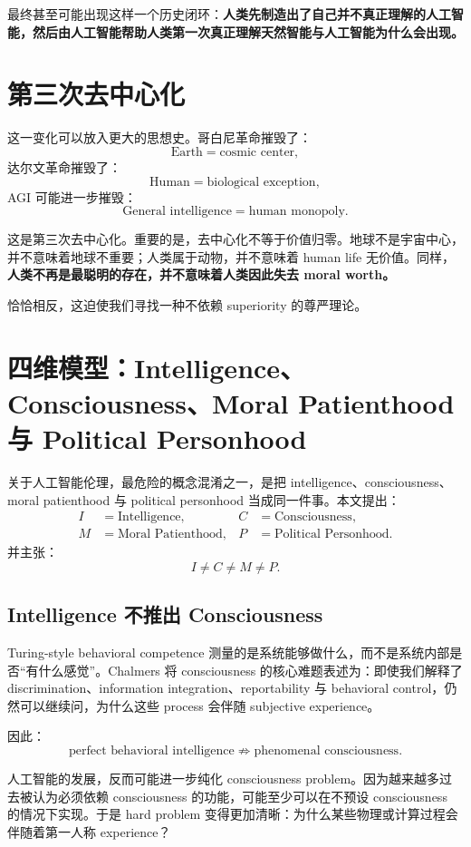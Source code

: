 \documentclass[11pt,letterpaper]{article}
\begin{document}
最终甚至可能出现这样一个历史闭环：\textbf{人类先制造出了自己并不真正理解的人工智能，然后由人工智能帮助人类第一次真正理解天然智能与人工智能为什么会出现。}

\section{第三次去中心化}

这一变化可以放入更大的思想史。哥白尼革命摧毁了：
\[
\text{Earth}=\text{cosmic center},
\]
达尔文革命摧毁了：
\[
\text{Human}=\text{biological exception},
\]
AGI 可能进一步摧毁：
\[
\text{General intelligence}=\text{human monopoly}.
\]

这是第三次去中心化。重要的是，去中心化不等于价值归零。地球不是宇宙中心，并不意味着地球不重要；人类属于动物，并不意味着 human life 无价值。同样，\textbf{人类不再是最聪明的存在，并不意味着人类因此失去 moral worth。}

恰恰相反，这迫使我们寻找一种不依赖 superiority 的尊严理论。

\section{四维模型：Intelligence、Consciousness、Moral Patienthood 与 Political Personhood}

关于人工智能伦理，最危险的概念混淆之一，是把 intelligence、consciousness、moral patienthood 与 political personhood 当成同一件事。本文提出：
\[
\begin{aligned}
I&=\text{Intelligence}, & C&=\text{Consciousness},\\
M&=\text{Moral Patienthood}, & P&=\text{Political Personhood}.
\end{aligned}
\]
并主张：
\[
\boxed{I\neq C\neq M\neq P}.
\]

\subsection{Intelligence 不推出 Consciousness}

Turing-style behavioral competence 测量的是系统能够做什么，而不是系统内部是否“有什么感觉”。Chalmers 将 consciousness 的核心难题表述为：即使我们解释了 discrimination、information integration、reportability 与 behavioral control，仍然可以继续问，为什么这些 process 会伴随 subjective experience\cite{chalmers1995,chalmers1996}。

因此：
\[
\text{perfect behavioral intelligence}
\nRightarrow
\text{phenomenal consciousness}.
\]

人工智能的发展，反而可能进一步纯化 consciousness problem。因为越来越多过去被认为必须依赖 consciousness 的功能，可能至少可以在不预设 consciousness 的情况下实现。于是 hard problem 变得更加清晰：为什么某些物理或计算过程会伴随着第一人称 experience？
\end{document}
